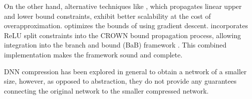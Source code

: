 On the other hand, alternative techniques like \cite{crown,deeppoly}, which
propagates linear upper and lower bound constraints, exhibit better
scalability at the cost of overapproximation. \cite{alpha-crown-bab-fnc} 
optimizes the bounds of \cite{crown} 
using gradient descent. 
\cite{beta-crown} incorporates ReLU split
constraints into the CROWN bound propagation process, allowing integration
into the branch and bound (BaB) framework
\cite{bab-fw,bab-piecewise-nn,bab-lagrangian-decomp}. 
This combined implementation makes the \abcrown framework sound and complete.

DNN compression has been explored \cite{dnn-compression} in general to obtain a
network of a smaller size, however, as opposed to abstraction, they do not
provide any guarantees connecting the original network to the smaller compressed
network. 
